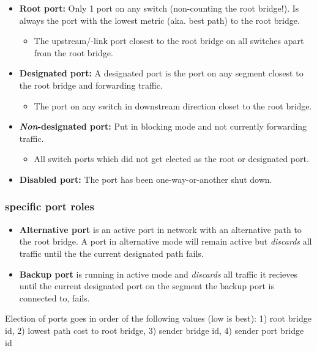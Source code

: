 \begin{itemize}
    \item \textbf{Root port:} Only 1 port on any switch (non-counting the root bridge!). Is always the port with the lowest metric (aka. best path) to the root bridge.
    \begin{itemize}
        \item The upstream/-link port closest to the root bridge on all switches apart from the root bridge.
    \end{itemize}
    \item \textbf{Designated port:} A designated port is the port on any segment closest to the root bridge and forwarding traffic.
    \begin{itemize}
        \item The port on any switch in downstream direction closet to the root bridge.
    \end{itemize}
    \item \textbf{\textit{Non}-designated port:} Put in blocking mode and not currently forwarding traffic.
    \begin{itemize}
        \item All switch ports which did not get elected as the root or designated port.
    \end{itemize}
    \item \textbf{Disabled port:} The port has been one-way-or-another shut down.
\end{itemize}

\subsubsection{specific port roles}
\begin{itemize}
    \item \textbf{Alternative port} is an active port in network with an alternative path to the root bridge. A port in alternative mode will remain active but \textit{discards} all traffic until the the current designated path fails.
    \item \textbf{Backup port} is running in active mode and \textit{discards} all traffic it recieves until the current designated port on the segment the backup port is connected to, fails.
\end{itemize}

Election of ports goes in order of the following values (low is best): 1) root bridge id, 2) lowest path cost to root bridge, 3) sender bridge id, 4) sender port bridge id

